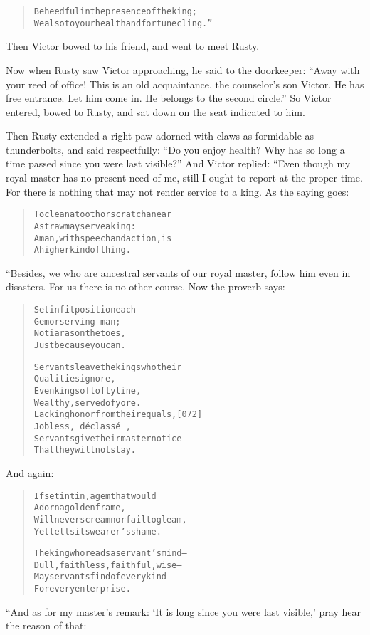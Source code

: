 \documentclass[article, twoside, 14pt]{memoir}
\renewenvironment{verbatim}{%
\begin{quote}%
\vskip -10pt%
\begin{alltt}\normalfont\large}{\end{alltt}%
\end{quote}%
\vskip -10pt
} %
\begin{document}
\begin{verbatim}
Be heedful in the presence of the king;
We also to your health and fortune cling.”
\end{verbatim}
Then Victor bowed to his friend, and went to meet Rusty.

Now when Rusty saw Victor approaching, he said to the doorkeeper:
``Away with your reed of office! This is an old acquaintance, the counselor's son Victor. He has free entrance. Let him come in. He belongs to the second circle.''
So Victor entered, bowed to Rusty, and sat down on the seat
indicated to him.

Then Rusty extended a right paw adorned with claws as formidable as
thunderbolts, and said respectfully:
``Do you enjoy health? Why has so long a time passed since you were last visible?''
And Victor replied: “Even though my royal master has no present
need of me, still I ought to report at the proper time. For there
is nothing that may not render service to a king. As the saying
goes:

\begin{verbatim}
To clean a tooth or scratch an ear
    A straw may serve a king:
A man, with speech and action, is
    A higher kind of thing.
\end{verbatim}
“Besides, we who are ancestral servants of our royal master, follow
him even in disasters. For us there is no other course. Now the
proverb says:

\begin{verbatim}
Set in fit position each
    Gem or serving-man;
No tiaras on the toes,
    Just because you can.

Servants leave the kings who their
    Qualities ignore,
Even kings of lofty line,
    Wealthy, served of yore.
Lacking honor from their equals,                        [072]
    Jobless, _déclassé_,
Servants give their master notice
    That they will not stay.
\end{verbatim}
And again:

\begin{verbatim}
If set in tin, a gem that would
    Adorn a golden frame,
Will never scream nor fail to gleam,
    Yet tells its wearer's shame.

The king who reads a servant's mind--
    Dull, faithless, faithful, wise--
May servants find of every kind
    For every enterprise.
\end{verbatim}
“And as for my master's remark:
`It is long since you were last visible,' pray hear the reason of
that:
\end{document}
